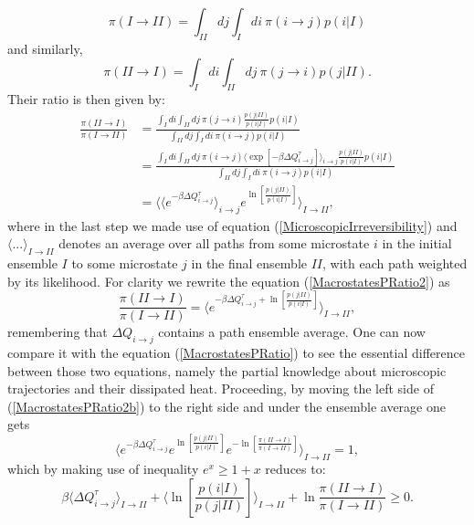 \documentclass[a4paper,12pt]{article}
\begin{document}
\begin{equation}
  \pi (I\to II)=\int_{II} d j \int_I d i\ \pi(i\to j)p(i|I)
\end{equation}
and similarly,
\begin{equation}
  \pi (II\to I)=\int_{I} d i \int_{II} d j\ \pi(j\to i)p(j|II).
\end{equation}
Their ratio is then given by:
\begin{equation}
\begin{aligned}
\label{MacrostatesPRatio2}
  \frac{\pi(II \to I)}{\pi(I \to II)} &= \frac{\int_{I} d i \int_{II} d j\ \pi(j\to i)\frac{p(j|II)}{p(i|I)}p(i|I)}{\int_{II} d j \int_I d i\ \pi(i\to j)p(i|I)}\\
  &= \frac{\int_{I} d i \int_{II} d j\ \pi(i\to j) \langle \exp[- \beta \Delta Q_{i\to j}^{\tau}] \rangle_{i \to j}  \frac{p(j|II)}{p(i|I)}p(i|I)}{\int_{II} d j \int_I d i\ \pi(i\to j) p(i|I)}\\
  &=\langle \langle e^{- \beta \Delta Q_{i\to j}^{\tau}} \rangle_{i \to j} e^{\ln[\frac{p(j|II)}{p(i|I)}]} \rangle_{I \to II},
\end{aligned}
\end{equation}
where in the last step we made use of equation (\ref{MicroscopicIrreversibility}) and  $\langle ... \rangle_{I \to II}$ denotes an average over all paths from some microstate
$i$ in the initial ensemble $I$ to some microstate $j$ in the final ensemble $II$, with each path weighted by its likelihood.
For clarity we rewrite the equation (\ref{MacrostatesPRatio2}) as 
\begin{equation}
\label{MacrostatesPRatio2b}
  \frac{\pi(II \to I)}{\pi(I \to II)} 
  =\langle e^{- \beta \Delta Q_{i\to j}^{\tau} + \ln[\frac{p(j|II)}{p(i|I)}]} \rangle_{I \to II},
\end{equation}
remembering that $\Delta Q_{i \to j}$ contains a path ensemble average. One can now compare it with the equation (\ref{MacrostatesPRatio}) to see the essential difference between those two equations, namely the partial knowledge about microscopic trajectories and their dissipated heat.
Proceeding, by moving the left side of (\ref{MacrostatesPRatio2b}) to the right side and under the ensemble average one gets
\begin{equation}
\langle  e^{- \beta \Delta Q_{i\to j}^{\tau}} e^{\ln[\frac{p(j|II)}{p(i|I)}]} e^{-\ln[\frac{\pi(II \to I)}{\pi(I \to II)}]} \rangle_{I \to II}=1,
\end{equation}
which by making use of inequality $e^x \geq 1+x$ reduces to:
\begin{equation}
  \beta \langle\Delta Q_{i\to j}^{\tau} \rangle_{I \to II}+\langle \ln[\frac{p(i|I)}{p(j|II)}]  \rangle_{I \to II}+ \ln{\frac{\pi(II \to I)}{\pi(I \to II)}} \geq 0.
\end{equation}
\end{document}
